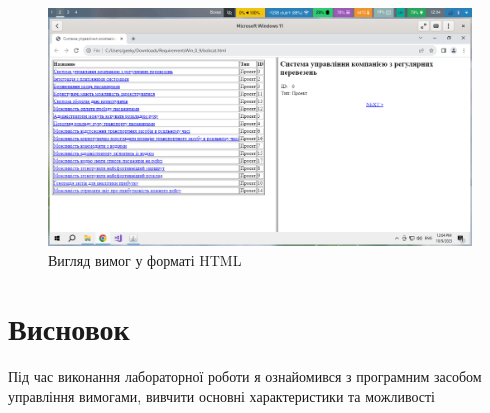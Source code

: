 \documentclass[14pt]{extreport}
\begin{document}
\begin{normalsize}
\begin{figure}[H]
	\centering
	\includegraphics[scale=0.35]{6}
	\caption{Вигляд вимог у форматі HTML}
\end{figure}
	\section*{Висновок}
	Під час виконання лабораторної роботи я ознайомився з програмним засобом управління вимогами, вивчити основні характеристики та можливості
	
\end{normalsize}
\end{document}
